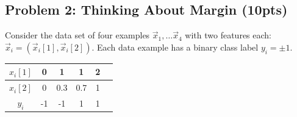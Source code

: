 \documentclass[10pt]{article}
\begin{document}
\subsection{Problem 2: Thinking About Margin (10pts)}
Consider the data set of four examples $\vec{x}_1, \ldots \vec{x}_4$ with two features each: $\vec{x}_i = (\vec{x}_i[1], \vec{x}_i[2])$. Each data example has a binary class
label $y_i=\pm 1$.

\begin{center}
	\begin{tabular}{|c|c|c|c|c|c|} \hline
		$x_{i}[1]$ & 0 & 1 & 1 & 2 \\ \hline
		$x_{i}[2]$ & 0 & 0.3 & 0.7 & 1 \\ \hline
		$y_i$ & -1 & -1 & 1 & 1 \\ \hline
	\end{tabular}
\end{center}
\end{document}
